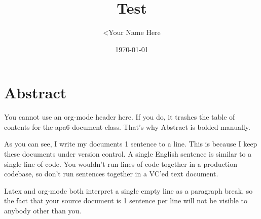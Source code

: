 \documentclass[11pt]{article}
\author{<Your Name Here}
\date{\today}
\title{Test}
\begin{document}
\maketitle
\tableofcontents


\section{Abstract}
\label{sec:org40fa855}

You cannot use an org-mode header here.
If you do, it trashes the table of contents for the apa6 document class.
That's why Abstract is bolded manually.

As you can see, I write my documents 1 sentence to a line.
This is because I keep these documents under version control.
A single English sentence is similar to a single line of code.
You wouldn't run lines of code together in a production codebase, so don't run sentences together in a VC'ed text document.

Latex and org-mode both interpret a single empty line as a paragraph break, so the fact that your source document is 1 sentence per line will not be visible to anybody other than you.

\cite{devlin2019}



\end{document}
